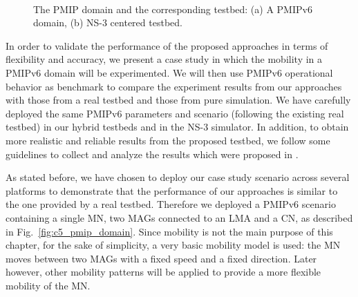 \begin{figure}[h!]
\centering
{}\,
\caption[The PMIP domain and the corresponding testbed.]{The PMIP domain and the corresponding testbed: (a) A PMIPv6 domain, (b) NS-3 centered testbed.}
\label{fig:scenario1}
\end{figure}

In order to validate the performance of the proposed approaches in terms of flexibility and accuracy, we present a case study in which the mobility in a PMIPv6 domain will be experimented. We will then use PMIPv6 operational behavior as benchmark to compare the experiment results from our approaches with those from a real testbed and those from pure simulation. We have carefully deployed the same PMIPv6 parameters and scenario (following the existing real testbed) in our hybrid testbeds and in the NS-3 simulator. In addition, to obtain more realistic and reliable results from the proposed testbed, we follow some guidelines to collect and analyze the results which were proposed in \cite{art_of_analysis}. 

As stated before, we have chosen to deploy our case study scenario across several platforms to demonstrate that the performance of our approaches is similar to the one provided by a real testbed. Therefore we deployed a PMIPv6 scenario containing a single MN, two MAGs connected to an LMA and a CN, as described in Fig.~\ref{fig:c5_pmip_domain}. Since mobility is not the main purpose of this chapter, for the sake of simplicity, a very basic mobility model is used: the MN moves between two MAGs with a fixed speed and a fixed direction. Later however, other mobility patterns will be applied to provide a more flexible mobility of the MN.

